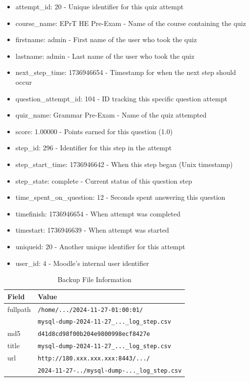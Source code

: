 \begin{itemize}
	\item attempt\_id: 20 - Unique identifier for this quiz attempt
	\item course\_name: EPrT HE Pre-Exam - Name of the course containing the quiz
	\item firstname: admin - First name of the user who took the quiz
	\item lastname: admin - Last name of the user who took the quiz
	\item next\_step\_time: 1736946654 - Timestamp for when the next step should occur
	\item question\_attempt\_id: 104 - ID tracking this specific question attempt
	\item quiz\_name: Grammar Pre-Exam - Name of the quiz attempted
	\item score: 1.00000 - Points earned for this question (1.0)
	\item step\_id: 296 - Identifier for this step in the attempt
	\item step\_start\_time: 1736946642 - When this step began (Unix timestamp)
	\item step\_state: complete - Current status of this question step
	\item time\_spent\_on\_question: 12 - Seconds spent answering this question
	\item timefinish: 1736946654 - When attempt was completed
	\item timestart: 1736946639 - When attempt was started
	\item uniqueid: 20 - Another unique identifier for this attempt
	\item user\_id: 4 - Moodle's internal user identifier
\end{itemize}



\begin{table}[h]
	\centering
	\caption{Backup File Information}
	\label{tab:backup_info}
	\small
	\begin{tabular}{|p{1.3cm}|p{6.5cm}|}
		\hline
		\textbf{Field} & \textbf{Value} \\ \hline
		fullpath & \texttt{\scriptsize /home/.../2024-11-27-01:00:01/} \\ 
		& \texttt{\scriptsize mysql-dump-2024-11-27\_...\_log\_step.csv} \\ \hline
		md5 & \texttt{\footnotesize d41d8cd98f00b204e9800998ecf8427e} \\ \hline
		title & \texttt{\footnotesize mysql-dump-2024-11-27\_...\_log\_step.csv} \\ \hline
		url & \texttt{\scriptsize http://180.xxx.xxx.xxx:8443/.../} \\
		& \texttt{\scriptsize 2024-11-27-../mysql-dump-...\_log\_step.csv} \\ \hline
	\end{tabular}
\end{table}

